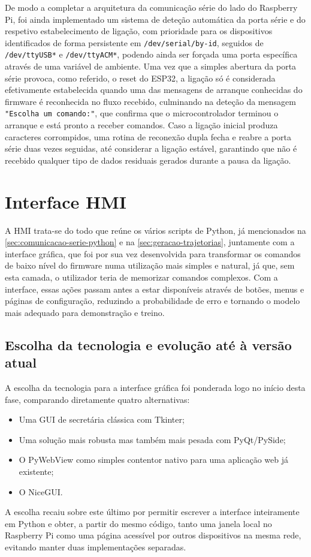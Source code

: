 De modo a completar a arquitetura da comunicação série do lado do Raspberry Pi, foi ainda implementado um sistema de deteção automática da porta série e do respetivo estabelecimento de ligação, com prioridade para os dispositivos identificados de forma persistente em \texttt{/dev/serial/by-id}, seguidos de \texttt{/dev/ttyUSB*} e \texttt{/dev/ttyACM*}, podendo ainda ser forçada uma porta específica através de uma variável de ambiente. Uma vez que a simples abertura da porta série provoca, como referido, o reset do ESP32, a ligação só é considerada efetivamente estabelecida quando uma das mensagens de arranque conhecidas do firmware é reconhecida no fluxo recebido, culminando na deteção da mensagem \texttt{"Escolha um comando:"}, que confirma que o microcontrolador terminou o arranque e está pronto a receber comandos. Caso a ligação inicial produza caracteres corrompidos, uma rotina de reconexão dupla fecha e reabre a porta série duas vezes seguidas, até considerar a ligação estável, garantindo que não é recebido qualquer tipo de dados residuais gerados durante a pausa da ligação.

\section{Interface HMI}
A HMI trata-se do todo que reúne os vários scripts de Python, já mencionados na \cref{sec:comunicacao-serie-python} e na \cref{sec:geracao-trajetorias}, juntamente com a interface gráfica, que foi por sua vez desenvolvida para transformar os comandos de baixo nível do firmware numa utilização mais simples e natural, já que, sem esta camada, o utilizador teria de memorizar comandos complexos. Com a interface, essas ações passam antes a estar disponíveis através de botões, menus e páginas de configuração, reduzindo a probabilidade de erro e tornando o modelo mais adequado para demonstração e treino.

\subsection{Escolha da tecnologia e evolução até à versão atual}
A escolha da tecnologia para a interface gráfica foi ponderada logo no início desta fase, comparando diretamente quatro alternativas:
\begin{itemize}
  \item Uma GUI de secretária clássica com Tkinter;
  \item Uma solução mais robusta mas também mais pesada com PyQt/PySide;
  \item O PyWebView como simples contentor nativo para uma aplicação web já existente;
  \item O NiceGUI.
\end{itemize}
A escolha recaiu sobre este último por permitir escrever a interface inteiramente em Python e obter, a partir do mesmo código, tanto uma janela local no Raspberry Pi como uma página acessível por outros dispositivos na mesma rede, evitando manter duas implementações separadas.

